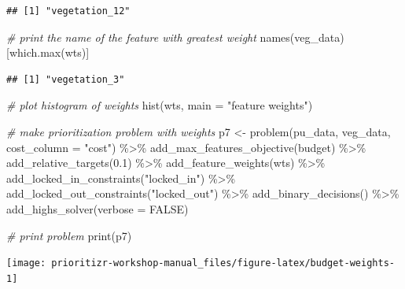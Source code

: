 \documentclass[
  12pt,
]{book}
\newenvironment{Shaded}{\begin{snugshade}}{\end{snugshade}}
\newcommand{\AttributeTok}[1]{\textcolor[rgb]{0.77,0.63,0.00}{#1}}
\newcommand{\CommentTok}[1]{\textcolor[rgb]{0.56,0.35,0.01}{\textit{#1}}}
\newcommand{\ConstantTok}[1]{\textcolor[rgb]{0.00,0.00,0.00}{#1}}
\newcommand{\FloatTok}[1]{\textcolor[rgb]{0.00,0.00,0.81}{#1}}
\newcommand{\FunctionTok}[1]{\textcolor[rgb]{0.00,0.00,0.00}{#1}}
\newcommand{\NormalTok}[1]{#1}
\newcommand{\OtherTok}[1]{\textcolor[rgb]{0.56,0.35,0.01}{#1}}
\newcommand{\SpecialCharTok}[1]{\textcolor[rgb]{0.00,0.00,0.00}{#1}}
\newcommand{\StringTok}[1]{\textcolor[rgb]{0.31,0.60,0.02}{#1}}
\begin{document}
\begin{verbatim}
## [1] "vegetation_12"
\end{verbatim}

\begin{Shaded}
\begin{Highlighting}[]
\CommentTok{\# print the name of the feature with greatest weight}
\FunctionTok{names}\NormalTok{(veg\_data)[}\FunctionTok{which.max}\NormalTok{(wts)]}
\end{Highlighting}
\end{Shaded}

\begin{verbatim}
## [1] "vegetation_3"
\end{verbatim}

\begin{Shaded}
\begin{Highlighting}[]
\CommentTok{\# plot histogram of weights}
\FunctionTok{hist}\NormalTok{(wts, }\AttributeTok{main =} \StringTok{"feature weights"}\NormalTok{)}

\CommentTok{\# make prioritization problem with weights}
\NormalTok{p7 }\OtherTok{\textless{}{-}} \FunctionTok{problem}\NormalTok{(pu\_data, veg\_data, }\AttributeTok{cost\_column =} \StringTok{"cost"}\NormalTok{) }\SpecialCharTok{\%\textgreater{}\%}
      \FunctionTok{add\_max\_features\_objective}\NormalTok{(budget) }\SpecialCharTok{\%\textgreater{}\%}
      \FunctionTok{add\_relative\_targets}\NormalTok{(}\FloatTok{0.1}\NormalTok{) }\SpecialCharTok{\%\textgreater{}\%}
      \FunctionTok{add\_feature\_weights}\NormalTok{(wts) }\SpecialCharTok{\%\textgreater{}\%}
      \FunctionTok{add\_locked\_in\_constraints}\NormalTok{(}\StringTok{"locked\_in"}\NormalTok{) }\SpecialCharTok{\%\textgreater{}\%}
      \FunctionTok{add\_locked\_out\_constraints}\NormalTok{(}\StringTok{"locked\_out"}\NormalTok{) }\SpecialCharTok{\%\textgreater{}\%}
      \FunctionTok{add\_binary\_decisions}\NormalTok{() }\SpecialCharTok{\%\textgreater{}\%}
      \FunctionTok{add\_highs\_solver}\NormalTok{(}\AttributeTok{verbose =} \ConstantTok{FALSE}\NormalTok{)}

\CommentTok{\# print problem}
\FunctionTok{print}\NormalTok{(p7)}
\end{Highlighting}
\end{Shaded}

\begin{center}\texttt{[image: prioritizr-workshop-manual\_files/figure-latex/budget-weights-1]} \end{center}
\end{document}
